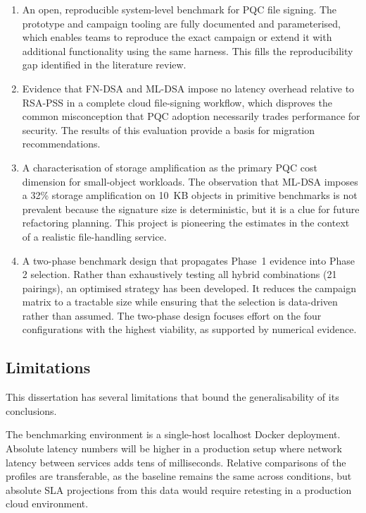 \documentclass[12pt,a4paper]{article}
\begin{document}
\begin{enumerate}
    \item An open, reproducible system-level benchmark for PQC file signing. The prototype and campaign tooling are fully documented and parameterised, which enables teams to reproduce the exact campaign or extend it with additional functionality using the same harness. This fills the reproducibility gap identified in the literature review.

    \item Evidence that FN-DSA and ML-DSA impose no latency overhead relative to RSA-PSS in a complete cloud file-signing workflow, which disproves the common misconception that PQC adoption necessarily trades performance for security. The results of this evaluation provide a basis for migration recommendations.

    \item A characterisation of storage amplification as the primary PQC cost dimension for small-object workloads. The observation that ML-DSA imposes a 32\% storage amplification on 10~KB objects in primitive benchmarks is not prevalent because the signature size is deterministic, but it is a clue for future refactoring planning. This project is pioneering the estimates in the context of a realistic file-handling service.

    \item A two-phase benchmark design that propagates Phase~1 evidence into Phase 2 selection. Rather than exhaustively testing all hybrid combinations (21 pairings), an optimised strategy has been developed. It reduces the campaign matrix to a tractable size while ensuring that the selection is data-driven rather than assumed. The two-phase design focuses effort on the four configurations with the highest viability, as supported by numerical evidence.

\end{enumerate}

\subsection{Limitations}
\label{sec:discussion:limitations}

This dissertation has several limitations that bound the generalisability of its conclusions.

The benchmarking environment is a single-host localhost Docker deployment. Absolute latency numbers will be higher in a production setup where network latency between services adds tens of milliseconds. Relative comparisons of the profiles are transferable, as the baseline remains the same across conditions, but absolute SLA projections from this data would require retesting in a production cloud environment.
\end{document}
